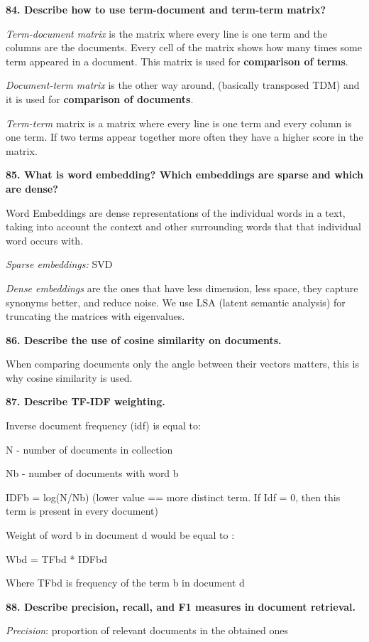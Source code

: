 \textbf{84. Describe how to use term-document and term-term matrix?}

\textit{Term-document matrix} is the matrix where every line is one
term and the columns are the documents. Every cell of the matrix shows
how many times some term appeared in a document. This matrix is used for
\textbf{comparison of terms}.

\textit{Document-term matrix} is the other way around, (basically
transposed TDM) and it is used for \textbf{comparison of documents}.

\textit{Term-term} matrix is a matrix where every line is one term
and every column is one term. If two terms appear together more often
they have a higher score in the matrix.

\textbf{85. What is word embedding? Which embeddings are sparse and
which are dense?}

Word Embeddings are dense representations of the individual words in a
text, taking into account the context and other surrounding words that
that individual word occurs with.

\textit{Sparse embeddings:} SVD

\textit{Dense embeddings} are the ones that have less dimension, less
space, they capture synonyms better, and reduce noise. We use LSA
(latent semantic analysis) for truncating the matrices with eigenvalues.

\textbf{86. Describe the use of cosine similarity on documents.}

When comparing documents only the angle between their vectors matters,
this is why cosine similarity is used.

\textbf{87. Describe TF-IDF weighting.}

Inverse document frequency (idf) is equal to:

N - number of documents in collection

Nb - number of documents with word b

IDFb = log(N/Nb) (lower value == more distinct term. If Idf = 0, then
this term is present in every document)

Weight of word b in document d would be equal to :

Wbd = TFbd * IDFbd

Where TFbd is frequency of the term b in document d

\textbf{88. Describe precision, recall, and F1 measures in document retrieval.}

\textit{Precision}: proportion of relevant documents in the obtained ones

